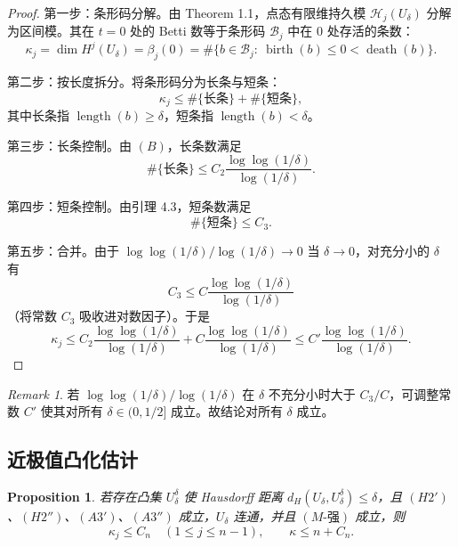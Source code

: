 \documentclass[11pt,a4paper]{article}
\newtheorem{proposition}[theorem]{Proposition}
\theoremstyle{remark}
\newtheorem{remark}[theorem]{Remark}
\begin{document}
	\begin{proof}
		第一步：条形码分解。由 \cite{CrawleyBoevey2015} Theorem 1.1，点态有限维持久模 $\mathcal H_j(U_\delta)$ 分解为区间模。其在 $t=0$ 处的 Betti 数等于条形码 $\mathcal B_j$ 中在 $0$ 处存活的条数：
		\[
		\kappa_j=\dim H^j(U_\delta)=\beta_j(0)=\#\{b\in\mathcal B_j:\ \operatorname{birth}(b)\le0<\operatorname{death}(b)\}.
		\]
		
		第二步：按长度拆分。将条形码分为长条与短条：
		\[
		\kappa_j\le \#\{\text{长条}\}+\#\{\text{短条}\},
		\]
		其中长条指 $\operatorname{length}(b)\ge\delta$，短条指 $\operatorname{length}(b)<\delta$。
		
		第三步：长条控制。由 $(B)$，长条数满足
		\[
		\#\{\text{长条}\}\le C_2\frac{\log\log(1/\delta)}{\log(1/\delta)}.
		\]
		
		第四步：短条控制。由引理 4.3，短条数满足
		\[
		\#\{\text{短条}\}\le C_3.
		\]
		
		第五步：合并。由于 $\log\log(1/\delta)/\log(1/\delta)\to0$ 当 $\delta\to0$，对充分小的 $\delta$ 有
		\[
		C_3\le C\frac{\log\log(1/\delta)}{\log(1/\delta)}
		\]
		（将常数 $C_3$ 吸收进对数因子）。于是
		\[
		\kappa_j\le C_2\frac{\log\log(1/\delta)}{\log(1/\delta)}+C\frac{\log\log(1/\delta)}{\log(1/\delta)}
		\le C'\frac{\log\log(1/\delta)}{\log(1/\delta)}.
		\]
	\end{proof}
	
	\begin{remark}
		若 $\log\log(1/\delta)/\log(1/\delta)$ 在 $\delta$ 不充分小时大于 $C_3/C$，可调整常数 $C'$ 使其对所有 $\delta\in(0,1/2]$ 成立。故结论对所有 $\delta$ 成立。
	\end{remark}
	
	\subsection{近极值凸化估计}
	\begin{proposition}
		若存在凸集 $U_\delta^\delta$ 使 Hausdorff 距离 $d_H(U_\delta,U_\delta^\delta)\le\delta$，且 $(H2')$、$(H2'')$、$(A3')$、$(A3'')$ 成立，$U_\delta$ 连通，并且 $(M‑强)$ 成立，则
		\[
		\kappa_j\le C_n\quad(1\le j\le n-1),\qquad \kappa\le n+C_n.
		\]
	\end{proposition}
	
\end{document}
